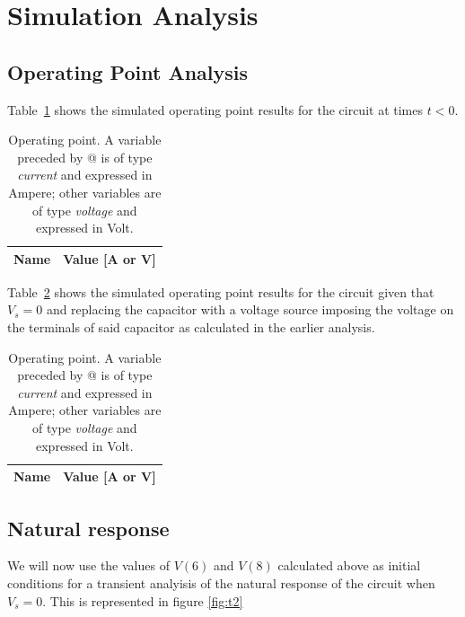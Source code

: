 \section{Simulation Analysis}
\label{sec:simulation}

\subsection{Operating Point Analysis}

Table~\ref{tab:p1} shows the simulated operating point results for the circuit
at times $t<0$.

\begin{table}[H]
  \centering
  \begin{tabular}{|l|r|}
    \hline    
    {\bf Name} & {\bf Value [A or V]} \\ \hline
    
  \end{tabular}
  \caption{Operating point. A variable preceded by @ is of type {\em current}
    and expressed in Ampere; other variables are of type {\it voltage} and expressed in
    Volt.}
  \label{tab:p1}
\end{table}

Table~\ref{tab:p2} shows the simulated operating point results for the circuit
given that $V_s=0$ and replacing the capacitor with a
voltage source imposing the voltage on the terminals of said capacitor
as calculated in the earlier analysis.

\begin{table}[H]
    \centering
    \begin{tabular}{|l|r|}
      \hline    
      {\bf Name} & {\bf Value [A or V]} \\ \hline
      
    \end{tabular}
    \caption{Operating point. A variable preceded by @ is of type {\em current}
      and expressed in Ampere; other variables are of type {\it voltage} and expressed in
      Volt.}
    \label{tab:p2}
  \end{table}

\subsection{Natural response}

We will now use the values of $V(6)$ and $V(8)$ calculated above as initial conditions
for a transient analyisis of the natural response of the circuit when $V_s=0$.
This is represented in figure \ref{fig:t2}

